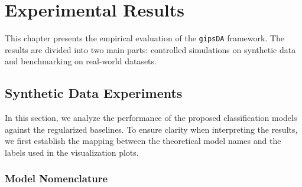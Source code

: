 \documentclass[a4paper,11pt,twoside]{report}
\theoremstyle{definition}
\begin{document}
%



\chapter{Experimental Results}
\label{ch:results}

This chapter presents the empirical evaluation of the \texttt{gipsDA} framework. The results are divided into two main parts: controlled simulations on synthetic data and benchmarking on real-world datasets.

\section{Synthetic Data Experiments}

In this section, we analyze the performance of the proposed classification models against the regularized baselines. To ensure clarity when interpreting the results, we first establish the mapping between the theoretical model names and the labels used in the visualization plots.

\subsection{Model Nomenclature}
\end{document}
